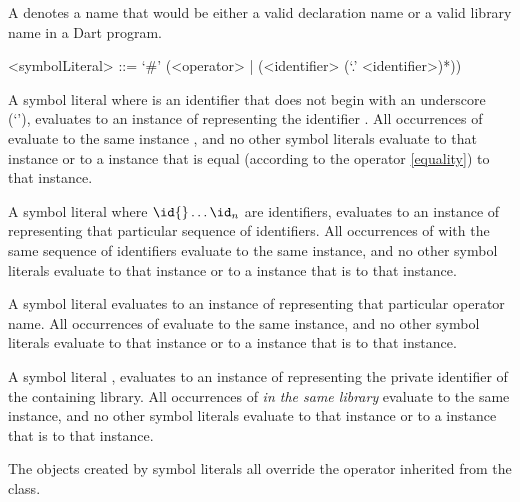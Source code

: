 \documentclass[makeidx]{article}
\begin{document}
{\LMHash{}%
A 
denotes a name that would be either
a valid declaration name or a valid library name in a Dart program.

\begin{grammar}
<symbolLiteral> ::= `#' (<operator> | (<identifier> (`.' <identifier>)*))
\end{grammar}

\LMHash{}%
A symbol literal \code{\#\id} where \id{} is an identifier
that does not begin with an underscore (`\code{\_}'),
evaluates to an instance of  representing the identifier \id.
All occurrences of \code{\#\id} evaluate to the same instance
,
and no other symbol literals evaluate to that  instance
or to a  instance that is equal
(according to the \lit{==} operator \ref{equality}) to that instance.

\LMHash{}%
A symbol literal 
where $\id{} \ldots \id_n$ are identifiers,
evaluates to an instance of  representing that particular sequence of identifiers.
All occurrences of  with the same sequence of identifiers
evaluate to the same instance,
and no other symbol literals evaluate to that  instance
or to a  instance that is \lit{==} to that instance.

\LMHash{}%
A symbol literal  evaluates to an instance of 
representing that particular operator name.
All occurrences of  evaluate to the same instance,
and no other symbol literals evaluate to that  instance
or to a  instance that is \lit{==} to that instance.

\LMHash{}%
A symbol literal \code{\#\_\id}, evaluates to an instance of 
representing the private identifier \code{\_\id} of the containing library.
All occurrences of \code{\#\_\id} \emph{in the same library} evaluate to the same instance,
and no other symbol literals evaluate to that  instance
or to a  instance that is \lit{==} to that instance.

\LMHash{}%
The objects created by symbol literals all override
the \lit{==} operator inherited from the  class.

}
\end{document}
